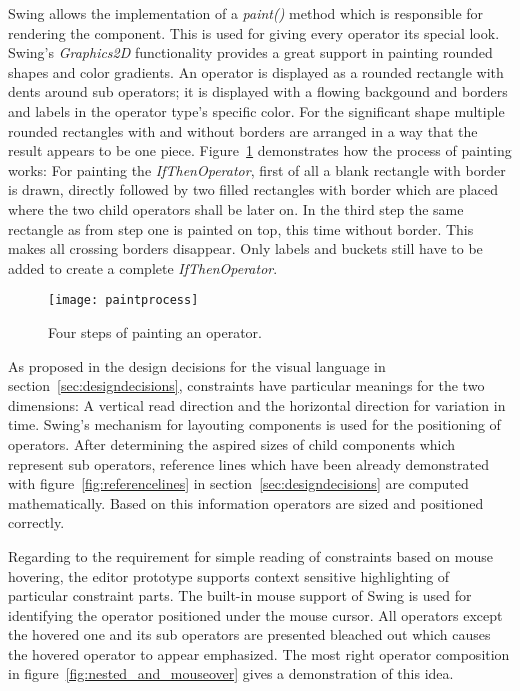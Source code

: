 Swing allows the implementation of a \emph{paint()} method which is responsible for rendering the component. This is used for giving every operator its special look. Swing's \emph{Graphics2D} functionality provides a great support in painting rounded shapes and color gradients. An operator is displayed as a rounded rectangle with dents around sub operators; it is displayed with a flowing backgound and borders and labels in the operator type's specific color. For the significant shape multiple rounded rectangles with and without borders are arranged in a way that the result appears to be one piece. Figure~\ref{fig:paintprocess} demonstrates how the process of painting works: For painting the \emph{IfThenOperator}, first of all a blank rectangle with border is drawn, directly followed by two filled rectangles with border which are placed where the two child operators shall be later on. In the third step the same rectangle as from step one is painted on top, this time without border. This makes all crossing borders disappear. Only labels and buckets still have to be added to create a complete \emph{IfThenOperator}.

\begin{figure}[htbp]
  \centering
  \texttt{[image: paintprocess]} 
  \caption{Four steps of painting an operator.}
  \label{fig:paintprocess}
\end{figure}


As proposed in the design decisions for the visual language in section~\ref{sec:designdecisions}, constraints have particular meanings for the two dimensions: A vertical read direction and the horizontal direction for variation in time. 
Swing's mechanism for layouting components is used for the positioning of operators. After determining the aspired sizes of child components which represent sub operators, reference lines which have been already demonstrated with figure~\ref{fig:referencelines} in section~\ref{sec:designdecisions} are computed mathematically. Based on this information operators are sized and positioned correctly.


Regarding to the requirement for simple reading of constraints based on mouse hovering, the editor prototype supports context sensitive highlighting of particular constraint parts.
The built-in mouse support of Swing is used for identifying the operator positioned under the mouse cursor. All operators except the hovered one and its sub operators are presented bleached out which causes the hovered operator to appear emphasized. The most right operator composition in figure~\ref{fig:nested_and_mouseover} gives a demonstration of this idea.

